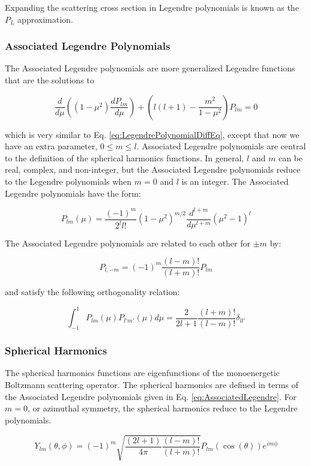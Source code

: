 \documentclass[10pt]{article}
\newcommand{\beq}{\begin{equation}}
\newcommand{\eeq}{\end{equation}}
\begin{document}
\begin{flushleft}
Expanding the scattering cross section in Legendre polynomials is known as the \(P_L\) approximation. 

\subsubsection{Associated Legendre Polynomials}

The Associated Legendre polynomials are more generalized Legendre functions that are the solutions to

\beq
\label{eq:AssociatedLegendrePolynomialDiffEq}
\frac{d}{d\mu} \left((1-\mu^2) \frac{dP_{lm}}{d\mu}\right) + \left(l(l+1) -\frac{m^2}{1-\mu^2}\right)P_{lm} = 0
\eeq

which is very similar to Eq. \ref{eq:LegendrePolynomialDiffEq}, except that now we have an extra parameter, \(0 \leq m \leq l\). Associated Legendre polynomials are central to the definition of the spherical harmonics functions. In general, \(l\) and \(m\) can be real, complex, and non-integer, but the Associated Legendre polynomials reduce to the Legendre polynomials when \(m=0\) and \(l\) is an integer. The Associated Legendre polynomials have the form:

\beq
\label{eq:AssociatedLegendre}
P_{lm}(\mu)=\frac{(-1)^m}{2^ll!}(1-\mu^2)^{m/2}\frac{d^{l+m}}{d\mu^{l+m}}(\mu^2-1)^l
\eeq

The Associated Legendre polynomials are related to each other for \(\pm m\) by:

\beq
\label{eq:relatingALP}
P_{l,-m}=(-1)^m\frac{(l-m)!}{(l+m)!}P_{lm}
\eeq

and satisfy the following orthogonality relation:

\beq
\label{eq:AssociatedLegendreOthogonality}
\int_{-1}^{1}P_{lm}(\mu)P_{l'm'}(\mu)d\mu=\frac{2}{2l+1}\frac{(l+m)!}{(l-m)!}\delta_{ll'}
\eeq

\subsubsection{Spherical Harmonics}

The spherical harmonics functions are eigenfunctions of the monoenergetic Boltzmann scattering operator. The spherical harmonics are defined in terms of the Associated Legendre polynomials given in Eq. \eqref{eq:AssociatedLegendre}. For \(m=0\), or azimuthal symmetry, the spherical harmonics reduce to the Legendre polynomials.

\beq
\label{eq:SphericaltoAssociated}
Y_{lm}(\theta,\phi)=(-1)^m\sqrt{\frac{(2l+1)}{4\pi}\frac{(l-m)!}{(l+m)!}}P_{lm}(\cos{(\theta)})e^{im\phi}
\eeq


\end{flushleft}
\end{document}
